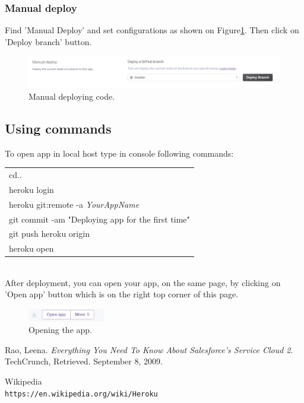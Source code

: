 \documentclass[12pt,a4paper]{article}
\begin{document}
\subsubsection{Manual deploy}
 Find 'Manual Deploy' and set configurations as shown on Figure\ref{fig:depp}. Then click on 'Deploy branch' button.

\begin{figure}[H]
	\centering
	\includegraphics[width=1\textwidth]{images/manual.PNG}
	\caption{Manual deploying code.}
	\label{fig:depp}
\end{figure}

\subsection{Using commands}
To open app in local host type in console following commands:\\
\begin{tabular}{|l|}
	\hline
	cd..\\
	heroku login\\
	heroku git:remote -a \textit{YourAppName}\\
	git commit -am "Deploying app for the first time"\\
	git push heroku origin\\
	heroku open\\
	\hline
\end{tabular}\\


After deployment, you can open your app, on the same page, by clicking on 'Open app' button which is on the right top corner of this page. 
\begin{figure}[H]
	\centering
	\includegraphics[width=0.3\textwidth]{images/openapp.PNG}
	\caption{Opening the app.}
	\label{fig:opapp}
\end{figure}
\begin{thebibliography}{bib}
	 Rao, Leena. 
	\textit{Everything You Need To Know About Salesforce's Service Cloud 2}. 
	TechCrunch, Retrieved. September 8, 2009.
	 
	
	Wikipedia
	\\\texttt{https://en.wikipedia.org/wiki/Heroku}
	
\end{thebibliography}
\end{document}
